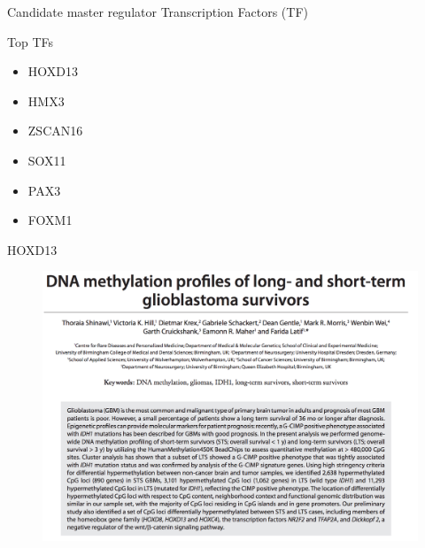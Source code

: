 \documentclass[slidestop,compress,11pt,xcolor=dvipsnames]{beamer}
\begin{document}



\begin{frame}{Candidate master regulator Transcription Factors (TF) }
\begin{block}{Top TFs}
  \begin{itemize}
    \item  HOXD13
    \item  HMX3
    \item  ZSCAN16
    \item  SOX11
    \item  PAX3
    \item  FOXM1
  \end{itemize}
\end{block}
\end{frame}

\begin{frame}{HOXD13}
\vspace{-0.5cm}
 \begin{figure}[ht!]
  \centering
  \includegraphics[width=1.0\textwidth]{glioma/paper_HOXD13b.png}
 \end{figure}
\end{frame}
\end{document}
